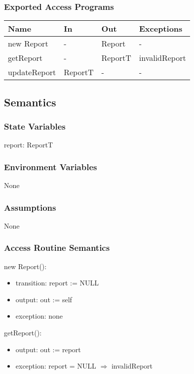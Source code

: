 \documentclass[12pt, titlepage]{article}
\begin{document}
\subsubsection{Exported Access Programs}
\begin{center}
\begin{tabular}{p{5cm} p{2cm} p{4cm} p{4cm}}
\hline
\textbf{Name} & \textbf{In} & \textbf{Out} & \textbf{Exceptions} \\
\hline
new Report & - & Report & - \\
\hline
getReport & - & ReportT & invalidReport \\
\hline
updateReport & ReportT & - & - \\
\hline

\end{tabular}
\end{center}

\subsection{Semantics}

\subsubsection{State Variables}
report: ReportT

\subsubsection{Environment Variables}
None
\subsubsection{Assumptions}
None
\subsubsection{Access Routine Semantics}

\noindent new Report():
\begin{itemize}
\item transition: report := NULL
\item output: out := self
\item exception: none
\end{itemize}

\noindent getReport():
\begin{itemize}
\item output: out := report
\item exception: report = NULL $\Rightarrow$ invalidReport
\end{itemize}
\end{document}
